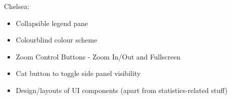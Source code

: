Chelsea: 
\begin{itemize}
    \itemsep0em 
    \item Collapsible legend pane
    \item Colourblind colour scheme
    \item Zoom Control Buttons - Zoom In/Out and Fullscreen
    \item Cat button to toggle side panel visibility
    \item Design/layouts of UI components (apart from statistics-related stuff)
\end{itemize}